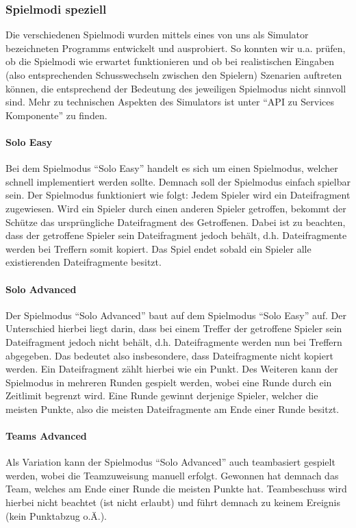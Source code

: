 \subsubsection{Spielmodi speziell}

Die verschiedenen Spielmodi wurden mittels eines von uns als Simulator bezeichneten Programms entwickelt und ausprobiert. So konnten wir u.a. prüfen, ob die Spielmodi wie erwartet funktionieren und ob bei realistischen Eingaben (also entsprechenden Schusswechseln zwischen den Spielern) Szenarien auftreten können, die entsprechend der Bedeutung des jeweiligen Spielmodus nicht sinnvoll sind. Mehr zu technischen Aspekten des Simulators ist unter “API zu Services Komponente” zu finden.

\paragraph{Solo Easy}
Bei dem Spielmodus “Solo Easy” handelt es sich um einen Spielmodus, welcher schnell implementiert werden sollte. Demnach soll der Spielmodus einfach spielbar sein. Der Spielmodus funktioniert wie folgt:
Jedem Spieler wird ein Dateifragment zugewiesen. Wird ein Spieler durch einen anderen Spieler getroffen, bekommt der Schütze das ursprüngliche Dateifragment des Getroffenen. Dabei ist zu beachten, dass der getroffene Spieler sein Dateifragment
jedoch behält, d.h. Dateifragmente werden bei Treffern somit kopiert. Das Spiel endet sobald ein Spieler alle existierenden Dateifragmente besitzt.

\paragraph{Solo Advanced}
Der Spielmodus “Solo Advanced” baut auf dem Spielmodus “Solo Easy” auf. Der Unterschied hierbei liegt darin, dass bei einem Treffer der getroffene Spieler sein Dateifragment jedoch nicht behält, d.h. Dateifragmente werden nun bei Treffern abgegeben. Das bedeutet also insbesondere, dass Dateifragmente nicht kopiert werden. Ein Dateifragment zählt hierbei wie ein Punkt. Des Weiteren kann der Spielmodus in mehreren Runden gespielt werden, wobei eine Runde durch ein Zeitlimit begrenzt wird. Eine Runde gewinnt derjenige Spieler, welcher die meisten Punkte, also die meisten Dateifragmente am Ende einer Runde besitzt.

\paragraph{Teams Advanced}
Als Variation kann der Spielmodus “Solo Advanced” auch teambasiert gespielt werden, wobei die Teamzuweisung manuell erfolgt. Gewonnen hat demnach das Team, welches am Ende einer Runde die meisten Punkte hat. Teambeschuss wird hierbei nicht beachtet (ist nicht erlaubt) und führt demnach zu keinem Ereignis (kein Punktabzug o.Ä.).

